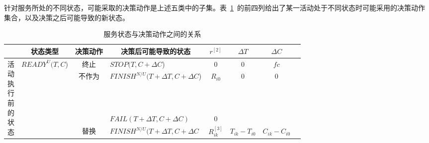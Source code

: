 针对服务所处的不同状态，可能采取的决策动作是上述五类中的子集。表~\ref{table:state_action}~的前四列给出了某一活动处于不同状态时可能采用的决策动作集合，以及决策之后可能导致的新状态。


\begin{table}[htbp]
      \caption{服务状态与决策动作之间的关系}
      \vspace{-0.5em}\label{table:state_action}\centering{}
    \begin{tabular}{rrrrrrrr}
        \toprule
        \multicolumn{1}{c|}{} 
        & \multicolumn{1}{c}{状态类型} 
        & \multicolumn{1}{|c}{决策动作} 
        & \multicolumn{1}{|c}{决策后可能导致的状态} 
        & \multicolumn{1}{|c}{$r^{[2]}$} 
        & \multicolumn{1}{|c}{$\Delta T$} 
        & \multicolumn{1}{|c}{$\Delta C$} \\
        \hline

        \multicolumn{1}{c|}{\multirow{9}{*}{\parbox{1em}{活\\动\\执\\行\\前\\的\\状\\态}}} 
        & \multirow{7}{*}{$READY^U(T,C$)} 
        & \multicolumn{1}{|c}{终止} 
        & \multicolumn{1}{|l}{$STOP(T, C+\Delta C$)} 
        & \multicolumn{1}{|c}{0} 
        & \multicolumn{1}{|c}{0} 
        & \multicolumn{1}{|c}{$fc$} \\
        \cline{3-7}

        \multicolumn{1}{c|}{} 
        &       
        & \multicolumn{1}{|c}{\multirow{2}{*}{不作为}} 
        & \multicolumn{1}{|l}{$FINISH^{N/U}(T+\Delta T, C+\Delta C$)} 
        & \multicolumn{1}{|c}{$R_{i0}$} 
        & \multicolumn{1}{|c}{\multirow{2}{*}{0}} 
        & \multicolumn{1}{|c}{\multirow{2}{*}{0}} \\

        \multicolumn{1}{c|}{} 
        &       
        & \multicolumn{1}{|c}{} 
        & \multicolumn{1}{|l}{$FAIL(T+\Delta T, C+\Delta C)$} 
        & \multicolumn{1}{|c}{0}
        & \multicolumn{1}{|c}{} 
        & \multicolumn{1}{|c}{} \\
        \cline{3-7}

        \multicolumn{1}{c|}{} 
        &       
        & \multicolumn{1}{|c}{\multirow{2}{*}{替换}} 
        & \multicolumn{1}{|l}{$FINISH^{N/U}(T+\Delta T, C+\Delta C$} 
        & \multicolumn{1}{|c}{$R_{ik}^{[3]}$} 
        & \multicolumn{1}{|c}{\multirow{2}{*}{$T_{ik}-T_{i0}$}} 
        & \multicolumn{1}{|c}{\multirow{2}{*}{$C_{ik}-C_{i0}$}} \\


\end{tabular}
\end{table}
